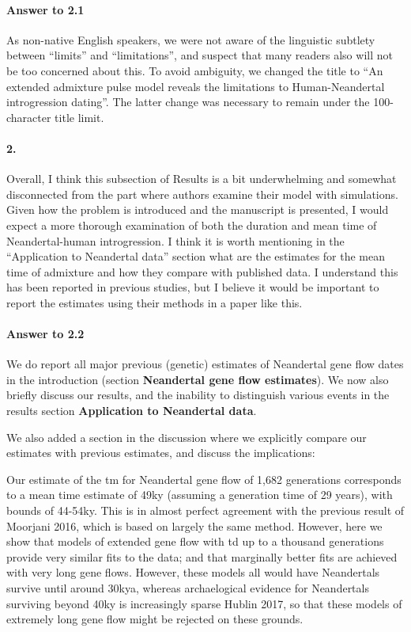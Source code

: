 \documentclass[11pt]{article}
\let\oldparagraph\paragraph
\renewcommand{\paragraph}[1]{\oldparagraph{#1}\mbox{}}
\begin{document}
\paragraph{Answer to 2.1}
As non-native English speakers, we were not aware of the linguistic subtlety between ``limits'' and  ``limitations'', and suspect that many readers also will not be too concerned about this. To avoid ambiguity, we changed the title to ``An extended admixture pulse model reveals the limitations to Human-Neandertal introgression dating''. The latter change was necessary to remain under the 100-character title limit.

\paragraph{2.}
Overall, I think this subsection of Results is a bit underwhelming and somewhat disconnected from the part where authors examine their model with simulations. Given how the problem is introduced and the manuscript is presented, I would expect a more thorough examination of both the duration and mean time of Neandertal-human introgression. I think it is worth mentioning in the “Application to Neandertal data” section what are the estimates for the mean time of admixture and how they compare with published data. I understand this has been reported in previous studies, but I believe it would be important to report the estimates using their methods in a paper like this.

\paragraph{Answer to 2.2}
We do report all major previous (genetic) estimates of Neandertal gene flow dates in the introduction (section \textbf{Neandertal gene flow estimates}). We now also briefly discuss our results, and the inability to distinguish various events in the results section \textbf{Application to Neandertal data}.

We also added a section in the discussion where we explicitly compare our estimates with previous estimates, and discuss the implications:

\begin{mdframed}[hidealllines=true,backgroundcolor=grey!20]
Our estimate of the tm for Neandertal gene flow of 1,682 generations corresponds to a mean time estimate of 49ky (assuming a generation time of 29 years), with bounds of 44-54ky. This is in almost perfect agreement with the previous result of Moorjani 2016, which is based on largely the same method. However, here we show that models of extended gene flow with td up to a thousand generations provide very similar fits to the data; and that marginally better fits are achieved with very long gene flows. However, these models all would have Neandertals survive until around 30kya, whereas archaelogical evidence for Neandertals surviving beyond 40ky is increasingly sparse Hublin 2017, so that these models of extremely long gene flow might be rejected on these grounds.\end{mdframed}
\end{document}

